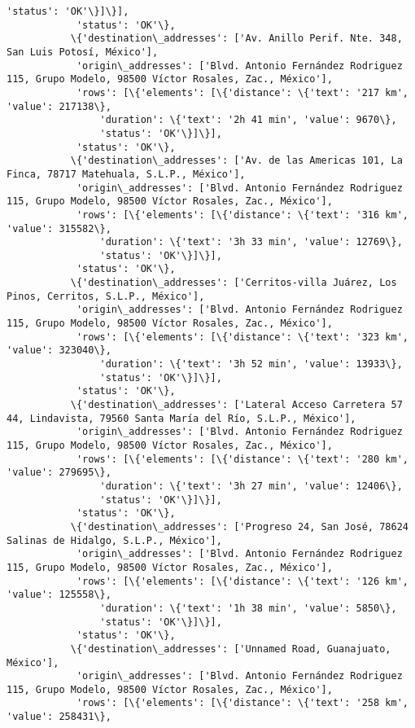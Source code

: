 \documentclass[11pt]{article}
\begin{document}
\begin{Verbatim}[commandchars=\\\{\}]
                'status': 'OK'\}]\}],
            'status': 'OK'\},
           \{'destination\_addresses': ['Av. Anillo Perif. Nte. 348, San Luis Potosí, México'],
            'origin\_addresses': ['Blvd. Antonio Fernández Rodriguez 115, Grupo Modelo, 98500 Víctor Rosales, Zac., México'],
            'rows': [\{'elements': [\{'distance': \{'text': '217 km', 'value': 217138\},
                'duration': \{'text': '2h 41 min', 'value': 9670\},
                'status': 'OK'\}]\}],
            'status': 'OK'\},
           \{'destination\_addresses': ['Av. de las Americas 101, La Finca, 78717 Matehuala, S.L.P., México'],
            'origin\_addresses': ['Blvd. Antonio Fernández Rodriguez 115, Grupo Modelo, 98500 Víctor Rosales, Zac., México'],
            'rows': [\{'elements': [\{'distance': \{'text': '316 km', 'value': 315582\},
                'duration': \{'text': '3h 33 min', 'value': 12769\},
                'status': 'OK'\}]\}],
            'status': 'OK'\},
           \{'destination\_addresses': ['Cerritos-villa Juárez, Los Pinos, Cerritos, S.L.P., México'],
            'origin\_addresses': ['Blvd. Antonio Fernández Rodriguez 115, Grupo Modelo, 98500 Víctor Rosales, Zac., México'],
            'rows': [\{'elements': [\{'distance': \{'text': '323 km', 'value': 323040\},
                'duration': \{'text': '3h 52 min', 'value': 13933\},
                'status': 'OK'\}]\}],
            'status': 'OK'\},
           \{'destination\_addresses': ['Lateral Acceso Carretera 57 44, Lindavista, 79560 Santa María del Río, S.L.P., México'],
            'origin\_addresses': ['Blvd. Antonio Fernández Rodriguez 115, Grupo Modelo, 98500 Víctor Rosales, Zac., México'],
            'rows': [\{'elements': [\{'distance': \{'text': '280 km', 'value': 279695\},
                'duration': \{'text': '3h 27 min', 'value': 12406\},
                'status': 'OK'\}]\}],
            'status': 'OK'\},
           \{'destination\_addresses': ['Progreso 24, San José, 78624 Salinas de Hidalgo, S.L.P., México'],
            'origin\_addresses': ['Blvd. Antonio Fernández Rodriguez 115, Grupo Modelo, 98500 Víctor Rosales, Zac., México'],
            'rows': [\{'elements': [\{'distance': \{'text': '126 km', 'value': 125558\},
                'duration': \{'text': '1h 38 min', 'value': 5850\},
                'status': 'OK'\}]\}],
            'status': 'OK'\},
           \{'destination\_addresses': ['Unnamed Road, Guanajuato, México'],
            'origin\_addresses': ['Blvd. Antonio Fernández Rodriguez 115, Grupo Modelo, 98500 Víctor Rosales, Zac., México'],
            'rows': [\{'elements': [\{'distance': \{'text': '258 km', 'value': 258431\},

\end{Verbatim}
\end{document}
